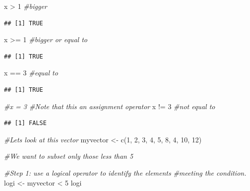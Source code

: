 \documentclass[
]{book}
\newenvironment{Shaded}{\begin{snugshade}}{\end{snugshade}}
\newcommand{\CommentTok}[1]{\textcolor[rgb]{0.56,0.35,0.01}{\textit{#1}}}
\newcommand{\DecValTok}[1]{\textcolor[rgb]{0.00,0.00,0.81}{#1}}
\newcommand{\FunctionTok}[1]{\textcolor[rgb]{0.00,0.00,0.00}{#1}}
\newcommand{\NormalTok}[1]{#1}
\newcommand{\OtherTok}[1]{\textcolor[rgb]{0.56,0.35,0.01}{#1}}
\newcommand{\SpecialCharTok}[1]{\textcolor[rgb]{0.00,0.00,0.00}{#1}}
\theoremstyle{definition}
\theoremstyle{definition}
\theoremstyle{definition}
\theoremstyle{definition}
\theoremstyle{remark}
\begin{document}
\begin{Shaded}
\begin{Highlighting}[]
\NormalTok{x }\SpecialCharTok{\textgreater{}} \DecValTok{1}      \CommentTok{\#bigger}
\end{Highlighting}
\end{Shaded}

\begin{verbatim}
## [1] TRUE
\end{verbatim}

\begin{Shaded}
\begin{Highlighting}[]
\NormalTok{x }\SpecialCharTok{\textgreater{}=} \DecValTok{1}     \CommentTok{\#bigger or equal to}
\end{Highlighting}
\end{Shaded}

\begin{verbatim}
## [1] TRUE
\end{verbatim}

\begin{Shaded}
\begin{Highlighting}[]
\NormalTok{x }\SpecialCharTok{==} \DecValTok{3}     \CommentTok{\#equal to}
\end{Highlighting}
\end{Shaded}

\begin{verbatim}
## [1] TRUE
\end{verbatim}

\begin{Shaded}
\begin{Highlighting}[]
\CommentTok{\#x = 3     \#Note that this an assignment operator}
\NormalTok{x }\SpecialCharTok{!=} \DecValTok{3}     \CommentTok{\#not equal to}
\end{Highlighting}
\end{Shaded}

\begin{verbatim}
## [1] FALSE
\end{verbatim}

\begin{Shaded}
\begin{Highlighting}[]
\CommentTok{\#Let\textquotesingle{}s look at this vector}
\NormalTok{myvector }\OtherTok{\textless{}{-}} \FunctionTok{c}\NormalTok{(}\DecValTok{1}\NormalTok{, }\DecValTok{2}\NormalTok{, }\DecValTok{3}\NormalTok{, }\DecValTok{4}\NormalTok{, }\DecValTok{5}\NormalTok{, }\DecValTok{8}\NormalTok{, }\DecValTok{4}\NormalTok{, }\DecValTok{10}\NormalTok{, }\DecValTok{12}\NormalTok{)}

\CommentTok{\#We want to subset only those less than 5}

\CommentTok{\#Step 1: use a logical operator to identify the elements}
\CommentTok{\#meeting the condition.}
\NormalTok{logi }\OtherTok{\textless{}{-}}\NormalTok{ myvector }\SpecialCharTok{\textless{}} \DecValTok{5} 
\NormalTok{logi}
\end{Highlighting}
\end{Shaded}
\end{document}
